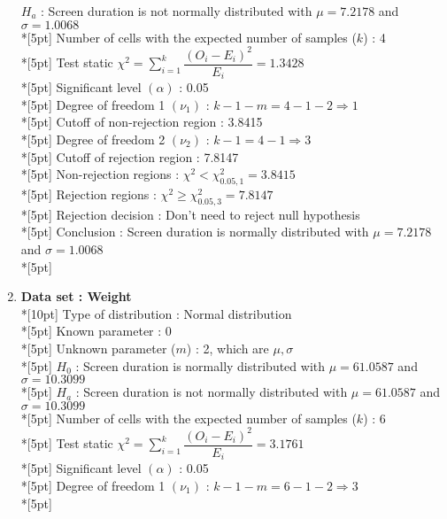 \begin{enumerate}
        $H_a$ : Screen duration is not normally distributed with $\mu=7.2178$ and $\sigma=1.0068$\\*[5pt]
        Number of cells with the expected number of samples ($k$) : 4\\*[5pt]
        Test static \(\chi^2=\displaystyle\sum\limits^k_{i=1}\dfrac{\left(O_i-E_i\right)^2}{E_i}=1.3428\)\\*[5pt]
        Significant level \(\left(\alpha\right)\) : 0.05\\*[5pt]
        Degree of freedom 1 \((\nu_1)\) : $k - 1 - m = 4 - 1 - 2 \Rightarrow 1$\\*[5pt]
        Cutoff of non-rejection region : 3.8415\\*[5pt]
        Degree of freedom 2 \((\nu_2)\) : $k - 1 = 4 - 1 \Rightarrow 3$\\*[5pt]
        Cutoff of rejection region : 7.8147\\*[5pt]
        Non-rejection regions : \(\chi^2 < \chi^2_{0.05, 1}=3.8415\)\\*[5pt]
        Rejection regions : \(\chi^2 \geq \chi^2_{0.05, 3}=7.8147\)\\*[5pt]
        Rejection decision : Don't need to reject null hypothesis\\*[5pt]
        Conclusion : Screen duration is normally distributed with $\mu=7.2178$ and $\sigma=1.0068$\\*[5pt]
    \item \textbf{Data set : Weight}\\*[10pt]
        Type of distribution : Normal distribution\\*[5pt]
        Known parameter : 0\\*[5pt]
        Unknown parameter ($m$) : 2, which are \(\mu, \sigma\)\\*[5pt]
        $H_0$ : Screen duration is normally distributed with $\mu=61.0587$ and $\sigma=10.3099$\\*[5pt]
        $H_a$ : Screen duration is not normally distributed with $\mu=61.0587$ and $\sigma=10.3099$\\*[5pt]
        Number of cells with the expected number of samples ($k$) : 6\\*[5pt]
        Test static \(\chi^2=\displaystyle\sum\limits^k_{i=1}\dfrac{\left(O_i-E_i\right)^2}{E_i}=3.1761\)\\*[5pt]
        Significant level \(\left(\alpha\right)\) : 0.05\\*[5pt]
        Degree of freedom 1 \((\nu_1)\) : $k - 1 - m = 6 - 1 - 2 \Rightarrow 3$\\*[5pt]

\end{enumerate}
